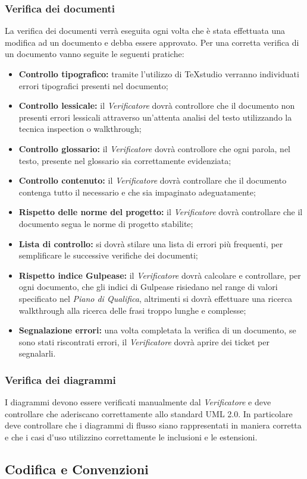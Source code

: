 \subsubsection{Verifica dei documenti}
La verifica dei documenti verrà eseguita ogni volta che è stata effettuata una modifica ad un documento e debba essere approvato.
Per una corretta verifica di un documento vanno seguite le seguenti pratiche:

\begin{itemize}
	\item \textbf{Controllo tipografico: }tramite l'utilizzo di TeXstudio verranno individuati errori tipografici presenti nel documento;
	\item \textbf{Controllo lessicale: }il \textit{Verificatore} dovrà controllore che il documento non presenti errori lessicali attraverso un'attenta analisi del testo utilizzando la tecnica \gls{inspection} o \gls{walkthrough};
	\item \textbf{Controllo glossario: }il \textit{Verificatore} dovrà controllore che ogni parola, nel testo, presente nel glossario sia correttamente evidenziata;
	\item \textbf{Controllo contenuto: }il \textit{Verificatore} dovrà controllare che il documento contenga tutto il necessario e che sia impaginato adeguatamente;
	\item \textbf{Rispetto delle norme del progetto: }il \textit{Verificatore} dovrà controllare che il documento segua le norme di progetto stabilite;
	\item \textbf{Lista di controllo: }si dovrà stilare una lista di errori più frequenti, per semplificare le successive verifiche dei documenti;
	\item \textbf{Rispetto \gls{indice Gulpease}: }il \textit{Verificatore} dovrà calcolare e controllare, per ogni documento, che gli \gls{indici di Gulpease} risiedano nel range di valori specificato nel \textit{Piano di Qualifica}, altrimenti si dovrà effettuare una ricerca \gls{walkthrough} alla ricerca delle frasi troppo lunghe e complesse;
	\item \textbf{Segnalazione errori: }una volta completata la verifica di un documento, se sono stati riscontrati errori, il \textit{Verificatore} dovrà aprire dei \gls{ticket} per segnalarli.
\end{itemize}
	
\subsubsection{Verifica dei diagrammi}
I diagrammi devono essere verificati manualmente dal \textit{Verificatore} e deve controllare che aderiscano correttamente allo standard \gls{UML} 2.0.
In particolare deve controllare che i diagrammi di flusso siano rappresentati in maniera corretta e che i \gls{casi d'uso} utilizzino correttamente le inclusioni e le estensioni.

\subsection{Codifica e Convenzioni}

